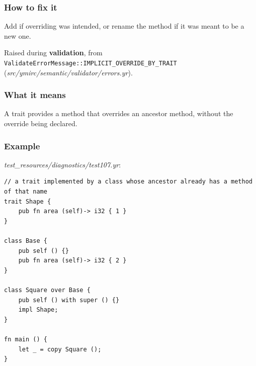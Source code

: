 \subsubsection*{How to fix it}

Add  if overriding was intended, or rename the method if it was meant to be a new one.

\label{sec:codes:e4091}

Raised during \textbf{validation}, from \texttt{ValidateErrorMessage::\allowbreak{}IMPLICIT\_\allowbreak{}OVERRIDE\_\allowbreak{}BY\_\allowbreak{}TRAIT} (\textit{src/\allowbreak{}ymirc/\allowbreak{}semantic/\allowbreak{}validator/\allowbreak{}errors.yr}).

\subsubsection*{What it means}

A trait  provides a method that overrides an ancestor method, without the override being declared.

\subsubsection*{Example}

\textit{test\_\allowbreak{}resources/\allowbreak{}diagnostics/\allowbreak{}test107.yr}:

\begin{lstlisting}[style=coloredverbatimError]
// a trait implemented by a class whose ancestor already has a method of that name
trait Shape {
    pub fn area (self)-> i32 { 1 }
}

class Base {
    pub self () {}
    pub fn area (self)-> i32 { 2 }
}

class Square over Base {
    pub self () with super () {}
    impl Shape;
}

fn main () {
    let _ = copy Square ();
}
\end{lstlisting}

